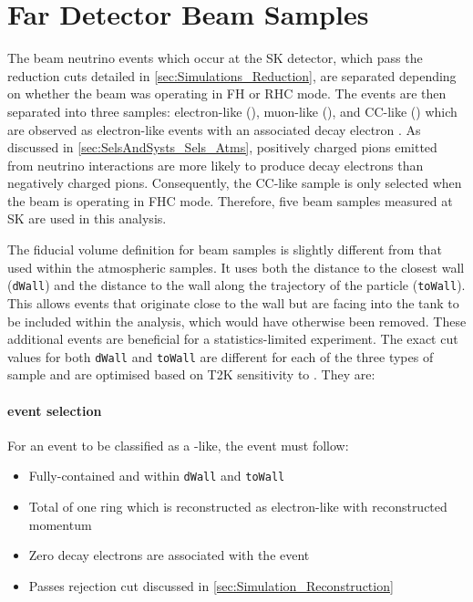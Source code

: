 \section{Far Detector Beam Samples}
\label{sec:SelsAndSysts_Sels_FD}

The beam neutrino events which occur at the SK detector, which pass the reduction cuts detailed in \autoref{sec:Simulations_Reduction}, are separated depending on whether the beam was operating in FH or RHC mode. The events are then separated into three samples: electron-like (), muon-like (), and CC\quickmath{1\pi^{+}}-like () which are observed as electron-like events with an associated decay electron \cite{t2k_tn_399}. As discussed in \autoref{sec:SelsAndSysts_Sels_Atms}, positively charged pions emitted from neutrino interactions are more likely to produce decay electrons than negatively charged pions. Consequently, the CC\quickmath{1\pi^{+}}-like sample is only selected when the beam is operating in FHC mode. Therefore, five beam samples measured at SK are used in this analysis.

The fiducial volume definition for beam samples is slightly different from that used within the atmospheric samples.  It uses both the distance to the closest wall (\texttt{dWall}) and the distance to the wall along the trajectory of the particle (\texttt{toWall}). This allows events that originate close to the wall but are facing into the tank to be included within the analysis, which would have otherwise been removed. These additional events are beneficial for a statistics-limited experiment. The exact cut values for both \texttt{dWall} and \texttt{toWall} are different for each of the three types of sample and are optimised based on T2K sensitivity to \dcp \cite{t2k_tn_318, t2k_tn_319}. They are:

\paragraph{ event selection}

For an event to be classified as a -like, the event must follow:

\begin{itemize}
\item Fully-contained and within \texttt{dWall}  and \texttt{toWall} 
\item Total of one ring which is reconstructed as electron-like with reconstructed momentum 
\item Zero decay electrons are associated with the event
\item Passes  rejection cut discussed in \autoref{sec:Simulation_Reconstruction}
\end{itemize}

